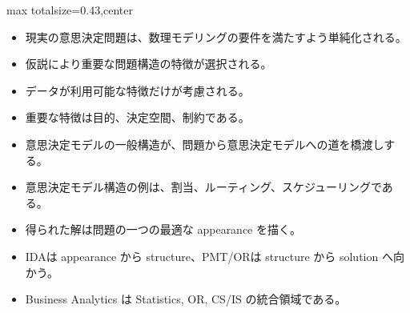 \clearpage
{}
\begin{minipage}[t]{0.405\textwidth}
\begin{adjustbox}{max totalsize={\textwidth}{0.43\textheight},center}
\begin{minipage}{\textwidth}\scriptsize
{}\begin{itemize}
\item 現実の意思決定問題は、数理モデリングの要件を満たすよう単純化される。
\item 仮説により重要な問題構造の特徴が選択される。
\item データが利用可能な特徴だけが考慮される。
\item 重要な特徴は目的、決定空間、制約である。
\item 意思決定モデルの一般構造が、問題から意思決定モデルへの道を橋渡しする。
\item 意思決定モデル構造の例は、割当、ルーティング、スケジューリングである。
\item 得られた解は問題の一つの最適な appearance を描く。
\end{itemize}\begin{itemize}
\item IDAは appearance から structure、PMT/ORは structure から solution へ向かう。
\item Business Analytics は Statistics, OR, CS/IS の統合領域である。
\end{itemize}
\end{minipage}
\end{adjustbox}
\end{minipage}\hfill
